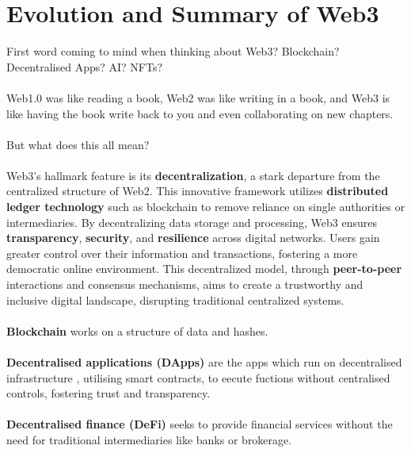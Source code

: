 \documentclass[a4paper,30pt]{report}
\begin{document}
      \section{Evolution and Summary of Web3} 
          First word coming to mind when thinking about Web3? Blockchain? Decentralised Apps? AI? NFTs?\\\\
          Web1.0 was like reading a book, Web2 was like writing in a book, and Web3 is like having the book write back to you and even collaborating on new chapters.\\\\ 
          But what does this all mean?\\\\ 
          Web3's hallmark feature is its \textbf{decentralization}, a stark departure from the centralized structure of Web2. This innovative framework utilizes \textbf{distributed ledger technology} such as blockchain to remove reliance on single authorities or intermediaries. By decentralizing data storage and processing, Web3 ensures \textbf{transparency}, \textbf{security}, and \textbf{resilience} across digital networks. Users gain greater control over their information and transactions, fostering a more democratic online environment. This decentralized model, through \textbf{peer-to-peer} interactions and consensus mechanisms, aims to create a trustworthy and inclusive digital landscape, disrupting traditional centralized systems.\\\\
          \textbf{Blockchain} works on a structure of data and hashes.\\\\ 
          \textbf{Decentralised applications (DApps)} are the apps which run on decentralised infrastructure , utilising smart contracts, to eecute fuctions without centralised controls, fostering trust and transparency.\\\\
          \textbf{Decentralised finance (DeFi)} seeks to provide financial services without the need for traditional intermediaries like banks or brokerage.\\\\ 
\end{document}
